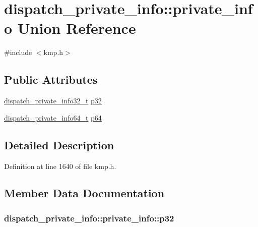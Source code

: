 \hypertarget{uniondispatch__private__info_1_1private__info}{\section{dispatch\-\_\-private\-\_\-info\-:\-:private\-\_\-info Union Reference}
\label{uniondispatch__private__info_1_1private__info}
}


{\ttfamily \#include $<$kmp.\-h$>$}

\subsection*{Public Attributes}
\begin{DoxyCompactItemize}
\item 
\hyperlink{kmp_8h_a2d7188e34fba0a6c6b85f6de73dc4b28}{dispatch\-\_\-private\-\_\-info32\-\_\-t} \hyperlink{uniondispatch__private__info_1_1private__info_a9ea87e2441f49d893aba7f2c69d9854b}{p32}
\item 
\hyperlink{kmp_8h_a0f4f3549766c34459bc0a3046d47d4ff}{dispatch\-\_\-private\-\_\-info64\-\_\-t} \hyperlink{uniondispatch__private__info_1_1private__info_a0d430fe4aad2d5875d4c9480a2ec984f}{p64}
\end{DoxyCompactItemize}


\subsection{Detailed Description}


Definition at line 1640 of file kmp.\-h.



\subsection{Member Data Documentation}
\hypertarget{uniondispatch__private__info_1_1private__info_a9ea87e2441f49d893aba7f2c69d9854b}{
\subsubsection[{p32}]{ dispatch\-\_\-private\-\_\-info\-::private\-\_\-info\-::p32}}\label{uniondispatch__private__info_1_1private__info_a9ea87e2441f49d893aba7f2c69d9854b}


